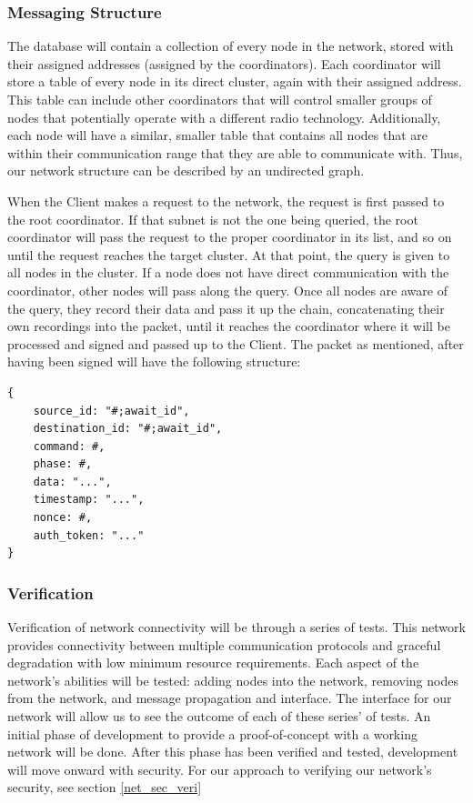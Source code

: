 \documentclass[tikz,a4paper,titlepage]{article}
\begin{document}
\subsubsection{Messaging Structure}

The database will contain a collection of every node in the network, stored with their assigned addresses (assigned by the coordinators). Each coordinator will store a table of every node in its direct cluster, again with their assigned address. This table can include other coordinators that will control smaller groups of nodes that potentially operate with a different radio technology. Additionally, each node will have a similar, smaller table that contains all nodes that are within their communication range that they are able to communicate with. Thus, our network structure can be described by an undirected graph.

When the Client makes a request to the network, the request is first passed to the root coordinator. If that subnet is not the one being queried, the root coordinator will pass the request to the proper coordinator in its list, and so on until the request reaches the target cluster. At that point, the query is given to all nodes in the cluster. If a node does not have direct communication with the coordinator, other nodes will pass along the query. Once all nodes are aware of the query, they record their data and pass it up the chain, concatenating their own recordings into the packet, until it reaches the coordinator where it will be processed and signed and passed up to the Client. The packet as mentioned, after having been signed will have the following structure: \\

\begin{lstlisting}
{
    source_id: "#;await_id",
    destination_id: "#;await_id",
    command: #,
    phase: #,
    data: "...",
    timestamp: "...",
    nonce: #,
    auth_token: "..."
}
\end{lstlisting}
\subsubsection{Verification}

Verification of network connectivity will be through a series of tests. This network provides connectivity between multiple communication protocols and graceful degradation with low minimum resource requirements. Each aspect of the network's abilities will be tested: adding nodes into the network, removing nodes from the network, and message propagation and interface. The interface for our network will allow us to see the outcome of each of these series' of tests. An initial phase of development to provide a proof-of-concept with a working network will be done. After this phase has been verified and tested, development will move onward with security. For our approach to verifying our network's security, see section \ref{net_sec_veri}
\end{document}
